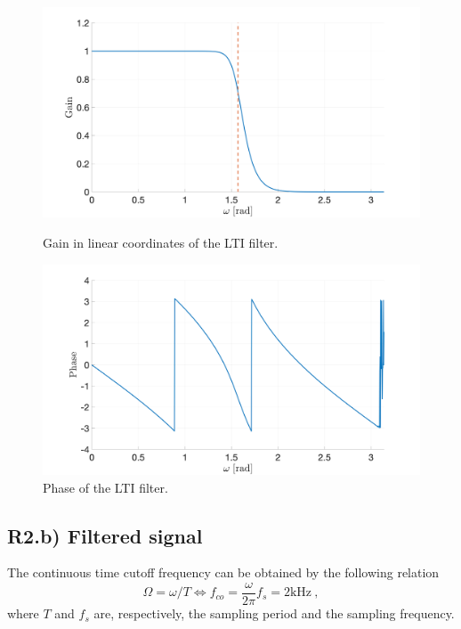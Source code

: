 \documentclass[]{scrartcl}
\begin{document}
\begin{figure}[htbp]
	\centering
	\begin{minipage}[b]{.49\textwidth}
		\centering
		\includegraphics[width= 1.1\textwidth]{figures/R2a_gain.png}
		\caption{Gain in linear coordinates of the LTI filter.}
		\label{fig:R2a_gain}
	\end{minipage}
	\hfill
	\begin{minipage}[b]{.49\textwidth}
		\centering
		\includegraphics[width= 1.1\textwidth]{figures/R2a_phase.png}
		\caption{Phase of the LTI filter.}
		\label{fig:R2a_phase}
	\end{minipage}
\end{figure}

\subsection{R2.b) Filtered signal}
The continuous time cutoff frequency can be obtained by the following relation
\begin{equation*}
\Omega = \omega/T \iff f_{co} = \frac{\omega}{2\pi}f_s = 2 \text{kHz}\:,
\end{equation*}
where $T$ and $f_s$ are, respectively, the sampling period and the sampling frequency.
\end{document}
